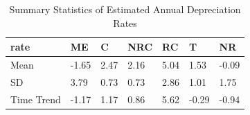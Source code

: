 \begin{table}[H]
\caption{Summary Statistics of Estimated Annual Depreciation Rates}
\label{table:depraciation_rates}
\centering
\begin{tabular}[t]{lllllll}
\toprule
rate & ME & C & NRC & RC & T & NR\\
\midrule
Mean & -1.65 & 2.47 & 2.16 & 5.04 & 1.53 & -0.09\\
SD & 3.79 & 0.73 & 0.73 & 2.86 & 1.01 & 1.75\\
Time Trend & -1.17 & 1.17 & 0.86 & 5.62 & -0.29 & -0.94\\
\bottomrule
\end{tabular}
\end{table}
